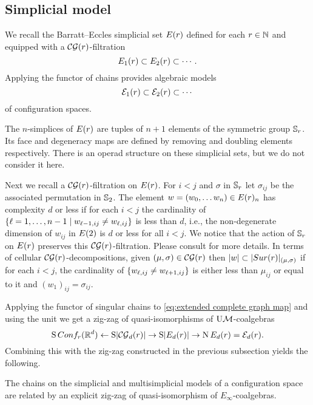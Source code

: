 
\subsection{Simplicial model}\label{ss:simplicial model}

We recall the Barratt--Eccles simplicial set $E(r)$ defined for each $r\in\mathbb{N}$ and equipped with a $\mathcal{CG}(r)$-filtration
\[
E_{1}(r) \subset E_{2}(r) \subset \dotsb.
\]
Applying the functor of chains provides algebraic models
\[
\mathcal{E}_{1}(r) \subset \mathcal{E}_{2}(r) \subset \dotsb
\]
of configuration spaces.

The $n$-simplices of $E(r)$ are tuples of $n+1$ elements of the symmetric group $\mathbb{S}_r$.
Its face and degeneracy maps are defined by removing and doubling elements respectively.
There is an operad structure on these simplicial sets, but we do not consider it here.

Next we recall a $\mathcal{CG}(r)$-filtration on $E(r)$.
For $i<j$ and $\sigma$ in $\mathbb{S}_r$ let $\sigma_{ij}$ be the associated permutation in $\mathbb{S}_2$.
The element $w = (w_0,\dots w_n) \in E(r)_n$ has complexity $d$ or less if for each $i<j$ the cardinality of $\{\ell=1,\dots,n-1 \mid w_{\ell-1,ij} \neq w_{\ell,ij}\}$ is less than $d$, i.e., the non-degenerate dimension of $w_{ij}$ in $E(2)$ is $d$ or less for all $i<j$.
We notice that the action of $\mathbb{S}_r$ on $E(r)$ preserves this $\mathcal{CG}(r)$-filtration.
Please consult \cite{smith1989filtration,kashiwabara1993confcomplex,berger1997confspacemodel} for more details.
In terms of cellular $\mathcal{CG}(r)$-decompositions, given $(\mu,\sigma) \in \mathcal{CG}(r)$ then $\lvert w\rvert \subset \lvert Sur(r)\rvert_{(\mu,\sigma)}$ if for each $i<j$, the cardinality of $\{w_{\ell,ij} \neq w_{\ell+1,ij}\}$ is either less than $\mu_{ij}$ or equal to it and $(w_1)_{ij} = \sigma_{ij}$.

Applying the functor of singular chains to \cref{eq:extended complete graph map} and using the unit we get a zig-zag of quasi-isomorphisms of $\mathrm{U}\mathcal{M}$-coalgebras
\begin{equation}\label{eq:simplicial zig-zag}
	\operatorname{S}Conf_{r}(\mathbb{R}^{d}) \leftarrow
	\operatorname{S}\lvert\mathcal{CG}_d(r)\rvert \to
	\operatorname{S}\lvert E_d(r)\rvert \to
	\operatorname{N} E_d(r)= \mathcal{E}_d(r).
\end{equation}
Combining this with the zig-zag constructed in the previous subsection yields the following.

\begin{theorem}
	The chains on the simplicial and multisimplicial models of a configuration space are related by an explicit zig-zag of quasi-isomorphism of $E_\infty$-coalgebras.
\end{theorem}